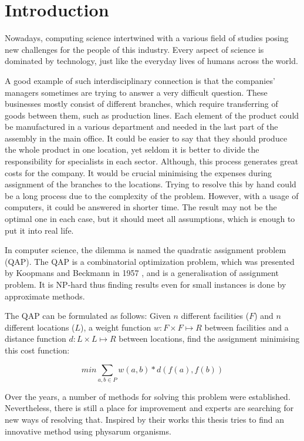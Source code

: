 \chapter{Introduction}
\label{chapter:introduction}

Nowadays, computing science intertwined with a various field of studies posing new challenges for the people of this industry.  Every aspect of science is dominated by technology, just like the everyday lives of humans across the world.

A good example of such interdisciplinary connection is that the companies' managers sometimes are trying to answer a very difficult question. These businesses mostly consist of different branches, which require transferring of goods between them, such as production lines. Each element of the product could be manufactured in a various department and needed in the last part of the assembly in the main office. It could be easier to say that they should produce the whole product in one location, yet seldom it is better to divide the responsibility for specialists in each sector. Although, this process generates great costs for the company. It would be crucial minimising the expenses during assignment of the branches to the locations. Trying to resolve this by hand could be a long process due to the complexity of the problem. However, with a usage of computers, it could be answered in shorter time. The result may not be the optimal one in each case, but it should meet all assumptions, which is enough to put it into real life.

In computer science, the dilemma is named the quadratic assignment problem (QAP).  The QAP is a combinatorial optimization problem, which was presented by Koopmans and Beckmann in 1957 \cite{koopmans-beckmann1957}, and is a generalisation of assignment problem. It is NP-hard thus finding results even for small instances is done by approximate methods.

The QAP can be formulated as follows: Given $ n $ different facilities ($F$) and $ n $ different locations ($L$), a weight function $ w: F \times F \mapsto R $ between facilities and a distance function $ d: L \times L \mapsto R $ between locations, find the assignment minimising this cost function:

\begin{equation}
min \sum_{a, b \in P } w(a, b) * d( f(a), f(b))
\end{equation}

Over the years, a number of methods for solving this problem were established. Nevertheless, there is still a place for improvement and experts are searching for new ways of resolving that. Inspired by their works this thesis tries to find an innovative method using physarum organisms.

